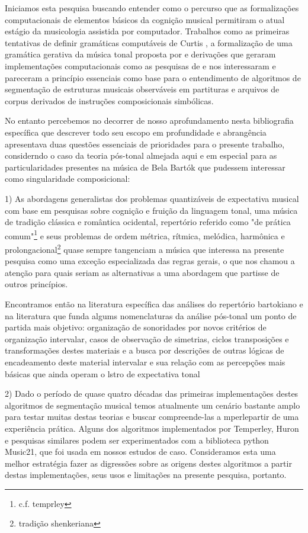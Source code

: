 \documentclass[
	12pt,				%
	openright,			%
	twoside,			%
	a4paper,			%
	english,			%
	french,				%
	spanish,			%
	brazil				%
	]{abntex2}
\begin{document}
Iniciamos esta pesquisa buscando entender como o percurso que as formalizações computacionais de elementos básicos da cognição musical permitiram o atual estágio da musicologia assistida por computador. Trabalhos como as primeiras tentativas de definir gramáticas computáveis de Curtis , a formalização de uma gramática gerativa da música tonal proposta por  e derivações que geraram implementações computacionais como as pesquisas de  e  nos interessaram e pareceram a princípio essenciais como base para o entendimento de algoritmos de segmentação de estruturas musicais observáveis em partituras e arquivos de corpus derivados de instruções composicionais simbólicas.

No entanto percebemos no decorrer de nosso aprofundamento nesta bibliografia específica que descrever todo seu escopo em profundidade e abrangência apresentava duas questões essenciais de prioridades para o presente trabalho, considerndo o caso da teoria pós-tonal almejada aqui e em especial para as particularidades presentes na música de Bela Bartók que pudessem interessar como singularidade composicional: 


1) As abordagens generalistas dos problemas quantizáveis de expectativa musical com base em pesquisas sobre cognição e fruição da linguagem tonal, uma música de tradição clássica e romântica ocidental, repertório referido como "de prática comum"\footnote{c.f. temprley} e seus problemas de ordem métrica, rítmica, melódica, harmônica e prolongacional\footnote{tradição shenkeriana} quase sempre tangenciam a música que interessa na presente pesquisa como uma exceção especializada das regras gerais, o que nos chamou a atenção para quais seriam as alternativas a uma abordagem que partisse de outros princípios. 

Encontramos então na literatura específica das análises do repertório bartokiano e na literatura que funda algums nomenclaturas da análise pós-tonal um ponto de partida mais objetivo: organização de sonoridades por novos critérios de organização intervalar, casos de observação de simetrias, ciclos transposições e transformações destes materiais e a busca por descrições de outras lógicas de encadeamento deste material intervalar e sua relação com as percepções mais básicas que ainda operam o lstro de expectativa tonal

2) Dado o período de quase quatro décadas das primeiras implementações destes algoritmos de segmentação musical temos atualmente um cenário bastante amplo para testar muitas destas teorias e buscar compreende-las a mperlepartir de uma experiência prática. Alguns dos algoritmos implementados por Temperley, Huron e pesquisas similares podem ser experimentados com a biblioteca python Music21, que foi usada em nossos estudos de caso. Consideramos esta uma melhor estratégia fazer as digressões sobre as origens destes algoritmos a partir destas implementações, seus usos e limitações na presente pesquisa, portanto.
\end{document}
